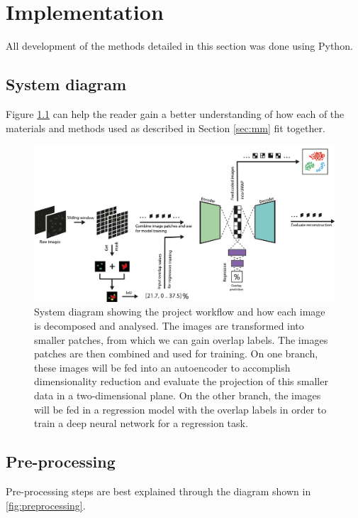 \chapter{Implementation} \label{sec:implementation}

All development of the methods detailed in this section was done using Python. 

\section{System diagram}

Figure \ref{fig:system} can help the reader gain a better understanding of how each of the materials and methods used as described in Section \ref{sec:mm} fit together.

\begin{figure}[h!]
    \centering
    \includegraphics[width=\textwidth]{dissertation/figures/system_diagram.pdf}
    \caption{System diagram showing the project workflow and how each image is decomposed and analysed. The images are transformed into smaller patches, from which we can gain overlap labels. The images patches are then combined and used for training. On one branch, these images will be fed into an autoencoder to accomplish dimensionality reduction and evaluate the projection of this smaller data in a two-dimensional plane. On the other branch, the images will be fed in a regression model with the overlap labels in order to train a deep neural network for a regression task.}
    \label{fig:system}
\end{figure}

\section{Pre-processing}

Pre-processing steps are best explained through the diagram shown in \autoref{fig:preprocessing}. 

